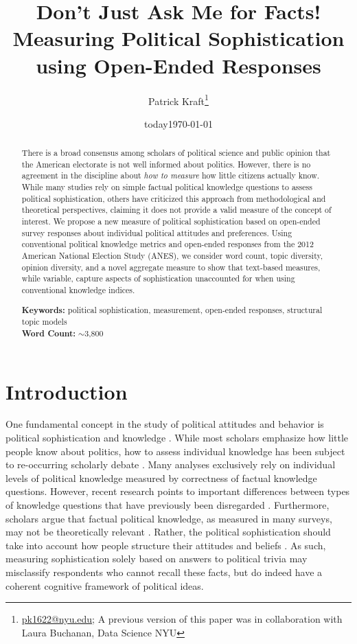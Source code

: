 \documentclass[12pt]{article}
\author{Patrick Kraft\footnote{\href{mailto:pk1622@nyu.edu}{pk1622@nyu.edu}; A previous version of this paper was in collaboration with Laura Buchanan, Data Science NYU}}
\date{today}
\title{Don't Just Ask Me for Facts!\\
\large{Measuring Political Sophistication using Open-Ended Responses}}
\date{\today}
\begin{document}
\maketitle\doublespacing\thispagestyle{empty}

\begin{abstract}
There is a broad consensus among scholars of political science and public opinion that the American electorate is not well informed about politics. However, there is no agreement in the discipline about \textit{how to measure} how little citizens actually know. While many studies rely on simple factual political knowledge questions to assess political sophistication, others have criticized this approach from methodological and theoretical perspectives, claiming it does not provide a valid measure of the concept of interest. We propose a new measure of political sophistication based on open-ended survey responses about individual political attitudes and preferences. Using conventional political knowledge metrics and open-ended responses from the 2012 American National Election Study (ANES), we consider word count, topic diversity, opinion diversity, and a novel aggregate measure to show that text-based measures, while variable, capture aspects of sophistication unaccounted for when using conventional knowledge indices.  


\vspace{\baselineskip}
\noindent \textbf{Keywords:} political sophistication, measurement, open-ended responses, structural topic models \\

\noindent \textbf{Word Count:} $\sim$3,800
\end{abstract}
\newpage\setcounter{page}{1}



\section{Introduction}

One fundamental concept in the study of political attitudes and behavior is political sophistication and knowledge \citep{converse1964nature,carpini1996americans}. While most scholars emphasize how little people know about politics, how to assess individual knowledge has been subject to re-occurring scholarly debate \citep[e.g.][]{mondak2000reconsidering,mondak2001asked,sturgis2008experiment,debell2013harder,pietryka2013analysis}. Many analyses exclusively rely on individual levels of political knowledge measured by correctness of factual knowledge questions. However, recent research points to important differences between types of knowledge questions that have previously been disregarded \citep{barabas2014question}. Furthermore, scholars argue that factual political knowledge, as measured in many surveys, may not be theoretically relevant \citep{lupia2006elitism}. Rather, the political sophistication should take into account how people structure their attitudes and beliefs 
\citep[e.g.][]{luskin1987measuring}. As such, measuring sophistication solely based on answers to political trivia may misclassify respondents who cannot recall these facts, but do indeed have a coherent cognitive framework of political ideas.
\end{document}
